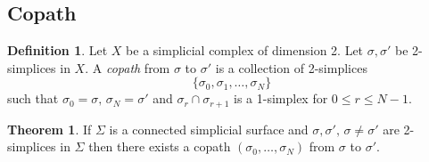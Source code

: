 \documentclass[a4paper,14pt]{extarticle}
\theoremstyle{definition}
\newtheorem*{theorem}{Theorem}
\newtheorem*{definition}{Definition}
\begin{document}
\subsection{Copath}
\begin{definition}
	Let $X$ be a simplicial complex of dimension 2. Let $\sigma,\sigma'$ be 2-simplices in 
	$X$. A \emph{copath} from $\sigma$ to $\sigma'$ is a collection of 2-simplices
	\[\{\sigma_0,\sigma_1,\ldots,\sigma_N\}\] such that $\sigma_0=\sigma,\,\sigma_N=\sigma'$
	and $\sigma_r\cap\sigma_{r+1}$ is a 1-simplex for $0\leq r\leq N-1$.
\end{definition}

\begin{theorem}
	If $\Sigma$ is a connected simplicial surface and $\sigma,\sigma', \,\sigma\neq\sigma'$ are 2-simplices in $\Sigma$ then there exists a copath $(\sigma_0,\ldots,\sigma_N)$ from 
	$\sigma$ to $\sigma'$.
\end{theorem}
\end{document}
